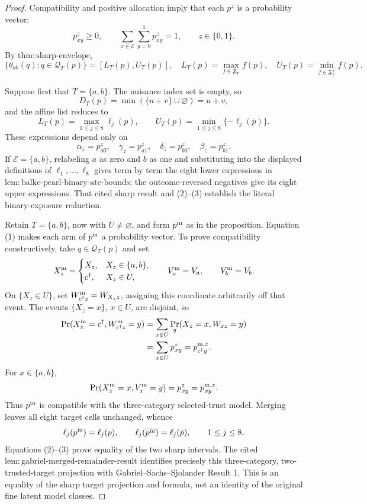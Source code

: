\documentclass{article}
\begin{document}
\begin{proof}
Compatibility and positive allocation imply that each \(p^z\) is a
probability vector:
\[
 p^z_{xy}\ge0,
 \qquad
 \sum_{x\in\mathcal E}\sum_{y=0}^1p^z_{xy}=1,
 \qquad z\in\{0,1\}. \tag{1}
\]
By \(\mathrm{thm{:}sharp\mbox{-}envelope}\),
\[
 \{\theta_{ab}(q):q\in\mathcal Q_T(p)\}=[L_T(p),U_T(p)],
 \quad
 L_T(p)=\max_{f\in\mathfrak F^-_T}f(p),
 \quad
 U_T(p)=\min_{f\in\mathfrak F^+_T}f(p). \tag{2}
\]

Suppose first that \(T=\{a,b\}\).  The nuisance index set is empty, so
\[
 D_T(p)=\min(\{u+v\}\cup\varnothing)=u+v,
\]
and the affine list reduces to
\[
 L_T(p)=\max_{1\le j\le8}\ell_j(p),
 \qquad
 U_T(p)=\min_{1\le j\le8}\{-\ell_j(\bar p)\}. \tag{3}
\]
These expressions depend only on
\[
 \alpha_z=p^z_{a0},\quad \gamma_z=p^z_{a1},\quad
 \delta_z=p^z_{b0},\quad \beta_z=p^z_{b1}.
\]
If \(\mathcal E=\{a,b\}\), relabeling \(a\) as zero and \(b\) as one and
substituting into the displayed definitions of \(\ell_1,\ldots,\ell_8\)
gives term by term the eight lower expressions in
\(\mathrm{lem{:}balke\mbox{-}pearl\mbox{-}binary\mbox{-}ate\mbox{-}bounds}\);
the outcome-reversed negatives give its eight upper expressions.  That
cited sharp result and (2)--(3) establish the literal binary-exposure
reduction.

Retain \(T=\{a,b\}\), now with \(U\ne\varnothing\), and form \(p^{\rm m}\)
as in the proposition.  Equation (1) makes each arm of \(p^{\rm m}\) a
probability vector.  To prove compatibility constructively, take
\(q\in\mathcal Q_T(p)\) and set
\[
 X_z^{\rm m}=\begin{cases}
 X_z,&X_z\in\{a,b\},\\
 c^\dagger,&X_z\in U,
 \end{cases}
 \qquad V_a^{\rm m}=V_a,
 \qquad V_b^{\rm m}=V_b.
\]
On \(\{X_z\in U\}\), set
\(W^{\rm m}_{c^\dagger z}=W_{X_z z}\), assigning this coordinate
arbitrarily off that event.  The events \(\{X_z=x\}\), \(x\in U\), are
disjoint, so
\[
\begin{aligned}
 \Pr(X_z^{\rm m}=c^\dagger,W^{\rm m}_{c^\dagger z}=y)
 &=\sum_{x\in U}\Pr_q(X_z=x,W_{xz}=y)\\
 &=\sum_{x\in U}p^z_{xy}=p^{{\rm m},z}_{c^\dagger y}.
\end{aligned}
\]
For \(x\in\{a,b\}\),
\[
 \Pr(X_z^{\rm m}=x,V_x^{\rm m}=y)=p^z_{xy}=p^{{\rm m},z}_{xy}.
\]
Thus \(p^{\rm m}\) is compatible with the three-category selected-trust
model.  Merging leaves all eight target cells unchanged, whence
\[
 \ell_j(p^{\rm m})=\ell_j(p),
 \qquad
 \ell_j(\overline{p^{\rm m}})=\ell_j(\bar p),
 \qquad 1\le j\le8.
\]
Equations (2)--(3) prove equality of the two sharp intervals.  The cited
\(\mathrm{lem{:}gabriel\mbox{-}merged\mbox{-}remainder\mbox{-}result}\)
identifies precisely this three-category, two-trusted-target projection with
Gabriel--Sachs--Sjolander Result 1.  This is an equality of the sharp target
projection and formula, not an identity of the original fine latent model
classes.


\end{proof}
\end{document}
